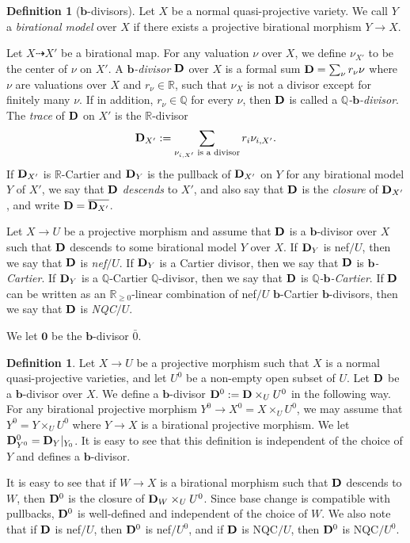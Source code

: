 \documentclass[11pt]{amsart}
\numberwithin{equation}{section}
\newcommand{\bb}{\bm{b}}
\newcommand{\Dd}{{\bf{D}}}
\newcommand{\Qq}{\mathbb{Q}}
\newcommand{\Rr}{\mathbb{R}}
\theoremstyle{definition}
\newtheorem{defn}[thm]{Definition}
\theoremstyle{definition}
\theoremstyle{definition}
\begin{document}
\begin{defn}[$\bb$-divisors]\label{defn: b divisors} Let $X$ be a normal quasi-projective variety. We call $Y$ a \emph{birational model} over $X$ if there exists a projective birational morphism $Y\to X$. 

Let $X\dashrightarrow X'$ be a birational map. For any valuation $\nu$ over $X$, we define $\nu_{X'}$ to be the center of $\nu$ on $X'$. A \emph{$\bb$-divisor} $\Dd$ over $X$ is a formal sum $\Dd=\sum_{\nu} r_{\nu}\nu$ where $\nu$ are valuations over $X$ and $r_{\nu}\in\mathbb R$, such that $\nu_X$ is not a divisor except for finitely many $\nu$. If in addition, $r_{\nu}\in\Qq$ for every $\nu$, then $\Dd$ is called a \emph{$\Qq$-$\bb$-divisor}. The \emph{trace} of $\Dd$ on $X'$ is the $\Rr$-divisor
$$\Dd_{X'}:=\sum_{\nu_{i,X'}\text{ is a divisor}}r_i\nu_{i,X'}.$$
If $\Dd_{X'}$ is $\Rr$-Cartier and $\Dd_{Y}$ is the pullback of $\Dd_{X'}$ on $Y$ for any birational model $Y$ of $X'$, we say that $\Dd$ \emph{descends} to $X'$, and also say that $\Dd$ is the \emph{closure} of $\Dd_{X'}$, and write $\Dd=\overline{\Dd_{X'}}$. 

Let $X\rightarrow U$ be a projective morphism and assume that $\Dd$ is a $\bb$-divisor over $X$ such that $\Dd$ descends to some birational model $Y$ over $X$. If $\Dd_Y$ is nef$/U$, then we say that $\Dd$ is \emph{nef}$/U$. If $\Dd_Y$ is a Cartier divisor, then we say that $\Dd$ is \emph{$\bb$-Cartier}. If $\Dd_Y$ is a $\Qq$-Cartier $\Qq$-divisor, then we say that $\Dd$ is \emph{$\Qq$-$\bb$-Cartier}. If $\Dd$ can be written as an $\Rr_{\geq 0}$-linear combination of nef$/U$ $\bb$-Cartier $\bb$-divisors, then we say that $\Dd$ is \emph{NQC}$/U$.

We let $\bm{0}$ be the $\bb$-divisor $\bar{0}$.
\end{defn}

\begin{defn}\label{defn: b divisor restriction over an open subset}
Let $X\rightarrow U$ be a projective morphism such that $X$ is a normal quasi-projective varieties, and let $U^0$ be a non-empty open subset of $U$. Let $\Dd$ be a $\bb$-divisor over $X$. We define a $\bb$-divisor $\Dd^0:=\Dd\times_UU^0$ in the following way. 
For any birational projective morphism $Y^0\to X^0=X\times _UU^0$, we may assume that $Y^0=Y\times _UU^0$ where $Y\to X$ is a birational projective morphism. We let $\Dd^0 _{Y^0}=\Dd _Y|_{Y_0}$. It is easy to see that this definition is independent of the choice of $Y$ and defines a $\bb$-divisor.

It is easy to see that if $W\rightarrow X$ is a birational morphism such that $\Dd$ descends to $W$, then $\Dd^0$ is the closure of $\Dd_W\times_{U}U^0$. Since base change is compatible with pullbacks, $\Dd^0$ is well-defined and independent of the choice of $W$. We also note that if $\Dd$ is nef$/U$, then $\Dd^0$ is nef$/U^0$, and if $\Dd$ is NQC$/U$, then $\Dd^0$ is NQC$/U^0$.
\end{defn}
\end{document}

